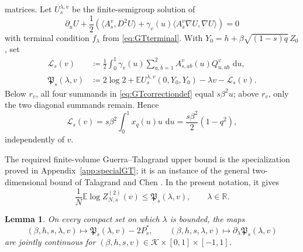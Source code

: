 \documentclass[11pt]{article}
\newtheorem{lemma}[theorem]{Lemma}
\numberwithin{equation}{section}
\newcommand{\E}{\mathbb{E}}
\newcommand{\1}{\mathbf 1}
\newcommand{\cK}{\mathcal K}
\newcommand{\dd}{\,\mathrm d}
\begin{document}
matrices.  Let $U^{\lambda,v}_s$ be the finite-semigroup solution of
\begin{equation}
 \partial_uU+\frac12\left(
   \langle A^v_s,D^2U\rangle
   +\gamma_v(u)\langle A^v_s\nabla U,\nabla U\rangle
 \right)=0
 \label{eq:2DParisiPDE}
\end{equation}
with terminal condition $f_\lambda$ from \eqref{eq:GTterminal}.  With
$Y_0=h+\beta\sqrt{(1-s)q}\,Z_0$, set
\begin{align}
 \mathcal L_s(v)
 &\coloneqq\frac12\int_0^1\gamma_v(u)
   \sum_{a,b=1}^2 A^v_{s,ab}(u)Q^v_{u,ab}\,\dd u,
 \label{eq:GTcorrectiondef}\\
 \mathfrak P_s(\lambda,v)
 &\coloneqq2\log2+\E U^{\lambda,v}_s(0,Y_0,Y_0)
   -\lambda v-\mathcal L_s(v).
 \label{eq:GTfunctional}
\end{align}
Below $r_v$, all four summands in \eqref{eq:GTcorrectiondef} equal
$s\beta^2u$; above $r_v$, only the two diagonal summands remain.  Hence
\begin{equation}
 \mathcal L_s(v)
 =s\beta^2\int_0^1x_q(u)u\,\dd u
 =\frac{s\beta^2}{2}(1-q^2),
 \label{eq:GTcorrection}
\end{equation}
independently of $v$.

The required finite-volume Guerra--Talagrand upper bound is the
specialization proved in Appendix~\ref{app:specialGT}; it is an instance
of the general two-dimensional bound of Talagrand and Chen
\cite{Talagrand,ChenGT}.  In the present notation, it gives
\begin{equation}
 \frac1N\E\log Z^{(2)}_{N,s}(v)
 \le \mathfrak P_s(\lambda,v),
 \qquad \lambda\in\mathbb R.
 \label{eq:GTfunctionalbound}
\end{equation}

\begin{lemma}
\label{lem:GTcontinuity}
On every compact set on which $\lambda$ is bounded, the maps
\[
 (\beta,h,s,\lambda,v)\longmapsto
 \mathfrak P_s(\lambda,v)-2P_s^*,
 \qquad
 (\beta,h,s,\lambda,v)\longmapsto
 \partial_\lambda\mathfrak P_s(\lambda,v)
\]
are jointly continuous for
$(\beta,h,s,v)\in\cK\times[0,1]\times[-1,1]$.
\end{lemma}
\end{document}
